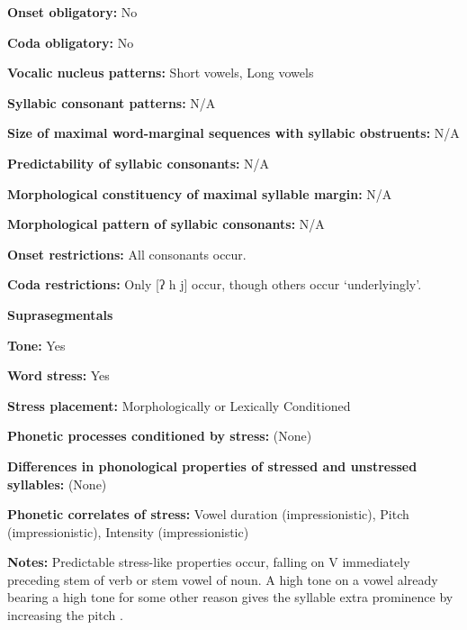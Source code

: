 \textbf{Onset obligatory:} No



\textbf{Coda obligatory:} No



\textbf{Vocalic nucleus patterns:} Short vowels, Long vowels



\textbf{Syllabic consonant patterns:} N/A



\textbf{Size of maximal word{}-marginal sequences with syllabic obstruents:} N/A



\textbf{Predictability of syllabic consonants:} N/A



\textbf{Morphological constituency of maximal syllable margin:} N/A



\textbf{Morphological pattern of syllabic consonants:} N/A



\textbf{Onset restrictions:} All consonants occur.



\textbf{Coda restrictions:} Only [ʔ h j] occur, though others occur ‘underlyingly’.



\textbf{Suprasegmentals}



\textbf{Tone:} Yes



\textbf{Word stress:} Yes



\textbf{Stress placement:} Morphologically or Lexically Conditioned



\textbf{Phonetic processes conditioned by stress:} (None)



\textbf{Differences in phonological properties of stressed and unstressed syllables:} (None)



\textbf{Phonetic correlates of stress:} Vowel duration (impressionistic), Pitch (impressionistic), Intensity (impressionistic)



\textbf{Notes:} Predictable stress-like properties occur, falling on V immediately preceding stem of verb or stem vowel of noun. A high tone on a vowel already bearing a high tone for some other reason gives the syllable extra prominence by increasing the pitch \citep[362]{Rice2005}.



